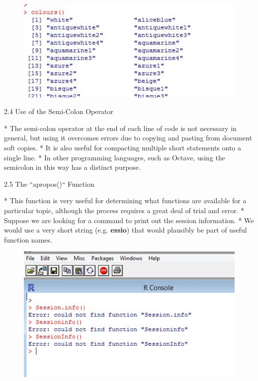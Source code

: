\documentclass{beamer}
\begin{document}
\begin{figure}
\centering
\includegraphics[width=1.2\linewidth]{images/Rcolours}
\end{figure}




{2.4 Use of the Semi-Colon Operator}

* The semi-colon operator at the end of each line of code is not necessary in general, but using it
overcomes errors due to copying and pasting from document soft copies. 
* It is also useful for compacting multiple short statements onto a single line.
* In other programming
languages, such as Octave, using the semicolon in this way has a distinct purpose.



{2.5 The ``apropos()`` Function}

* This function is very useful for determining what functions are available for a particular topic,
although the process requires a great deal of trial and error. 
* Suppose we are looking for a
command to print out the session information. 
* We would use a very short string (e.g. \textbf{essio})
that would plausibly be part of useful function names.




\begin{figure}
\centering
\includegraphics[width=1.2\linewidth]{images/Rapropos1}       
\end{figure}
   
\end{document}
